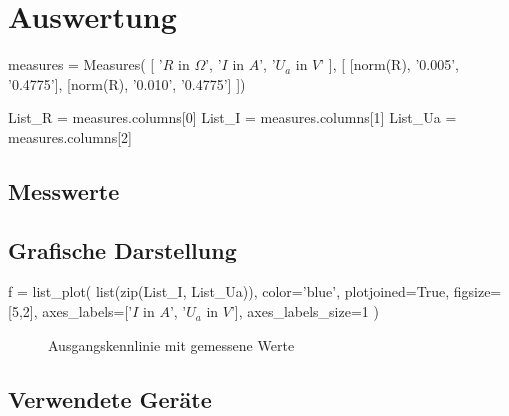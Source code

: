 \documentclass[a4paper]{hitec}
\begin{document}
\section{Auswertung}

\begin{sagesilent}
    measures = Measures(
        [
            '$R$ in $\Omega$',
            '$I$ in $A$', 
            '$U_a$ in $V$'
        ], [
            [norm(R), '0.005', '0.4775'],
            [norm(R), '0.010', '0.4775']
    ])

    List_R = measures.columns[0]
    List_I = measures.columns[1]
    List_Ua = measures.columns[2]
\end{sagesilent}

\subsection{Messwerte}

\begin{center}
    \renewcommand{\arraystretch}{1.2}
\end{center}

\subsection{Grafische Darstellung}

\begin{sagesilent}
    f = list_plot(
        list(zip(List_I, List_Ua)),
        color='blue',
        plotjoined=True,
        figsize=[5,2],
        axes_labels=['$I$ in $A$', '$U_a$ in $V$'],
        axes_labels_size=1
    )
\end{sagesilent}

\begin{figure}[H]
    \centering
    \caption{Ausgangskennlinie mit gemessene Werte}
\end{figure}

\clearpage

\subsection{Verwendete Geräte}

\medskip

\begin{devicelist}
\end{devicelist}

\vfill

\IncludeHistoryTimeline
\end{document}
